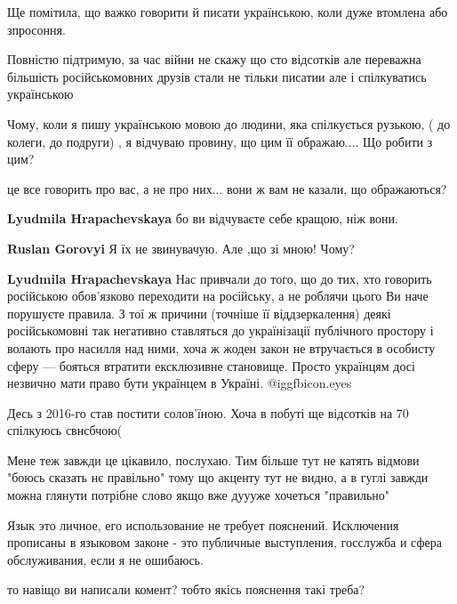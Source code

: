 \begin{itemize}
\begin{itemize}
Ще помітила, що важко говорити й писати українською, коли дуже втомлена або зпросоння.

\end{itemize} %


Повністю підтримую, за час війни не скажу що сто відсотків але переважна
більшість російськомовних друзів стали не тільки писатии але і спілкуватись
українською


Чому, коли я пишу українською мовою до людини, яка спілкується рузькою, ( до
колеги, до подруги) , я відчуваю провину, що цим її ображаю.... Що робити з
цим?

\begin{itemize} %
це все говорить про вас, а не про них... вони ж вам не казали, що ображаються?

\textbf{Lyudmila Hrapachevskaya} бо ви відчуваєте себе кращою, ніж вони.

\textbf{Ruslan Gorovyi} Я їх не звинувачую. Але ,що зі мною! Чому?

\textbf{Lyudmila Hrapachevskaya} Нас привчали до того, що до тих, хто говорить російською обов'язково переходити на російську, а не роблячи цього Ви наче порушуєте правила. З тої ж причини (точніше її віддзеркалення) деякі російськомовні так негативно ставляться до українізації публічного простору і волають про насилля над ними, хоча ж жоден закон не втручається в особисту сферу — бояться втратити ексклюзивне становище. Просто українцям досі незвично мати право бути українцем в Україні.  @igg{fbicon.eyes} 
\end{itemize} %

Десь з 2016-го став постити солов'їною. Хоча в побуті ще відсотків на 70 спілкуюсь свнсбчою(

Мене теж завжди це цікавило, послухаю.
Тим більше тут не катять відмови "боюсь сказать нє правільно" тому що акценту тут не видно, а в гуглі завжди можна глянути потрібне слово якщо вже дуууже хочеться "правильно"


Язык это личное, его использование не требует пояснений. Исключения прописаны в
языковом законе - это публичные выступления, госслужба и сфера обслуживания,
если я не ошибаюсь.

\begin{itemize} %
то навіщо ви написали комент? тобто якісь пояснення такі треба?


\end{itemize}
\end{itemize}
